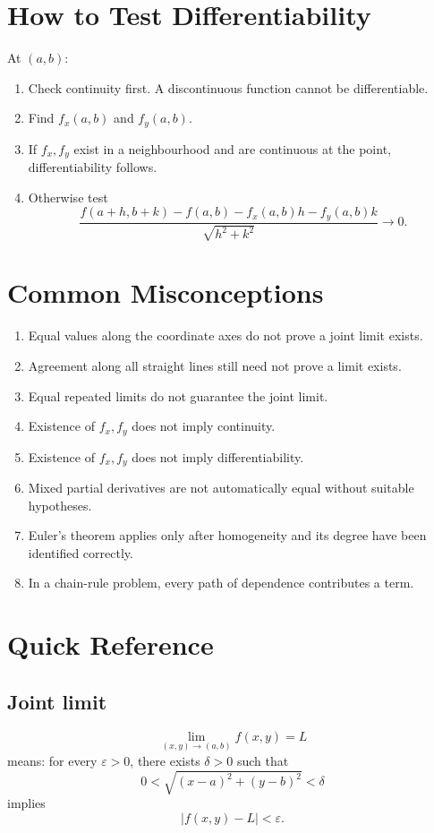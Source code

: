 \documentclass[11pt,oneside]{book}
\theoremstyle{studentthm}
\theoremstyle{definition}
\newcommand{\eps}{\varepsilon}
\newcommand{\abs}[1]{\left|#1\right|}
\begin{document}
\section{How to Test Differentiability}

At \((a,b)\):

\begin{enumerate}
\item Check continuity first. A discontinuous function cannot be
differentiable.
\item Find \(f_x(a,b)\) and \(f_y(a,b)\).
\item If \(f_x,f_y\) exist in a neighbourhood and are continuous at
the point, differentiability follows.
\item Otherwise test
\[
\frac{
f(a+h,b+k)-f(a,b)-f_x(a,b)h-f_y(a,b)k
}{
\sqrt{h^2+k^2}
}
\to0.
\]
\end{enumerate}

\section{Common Misconceptions}

\begin{enumerate}
\item Equal values along the coordinate axes do not prove a joint
limit exists.
\item Agreement along all straight lines still need not prove a limit
exists.
\item Equal repeated limits do not guarantee the joint limit.
\item Existence of \(f_x,f_y\) does not imply continuity.
\item Existence of \(f_x,f_y\) does not imply differentiability.
\item Mixed partial derivatives are not automatically equal without
suitable hypotheses.
\item Euler's theorem applies only after homogeneity and its degree
have been identified correctly.
\item In a chain-rule problem, every path of dependence contributes a
term.
\end{enumerate}

\section{Quick Reference}

\subsection*{Joint limit}
\[
\lim_{(x,y)\to(a,b)}f(x,y)=L
\]
means: for every \(\eps>0\), there exists \(\delta>0\) such that
\[
0<\sqrt{(x-a)^2+(y-b)^2}<\delta
\]
implies
\[
\abs{f(x,y)-L}<\eps.
\]
\end{document}
